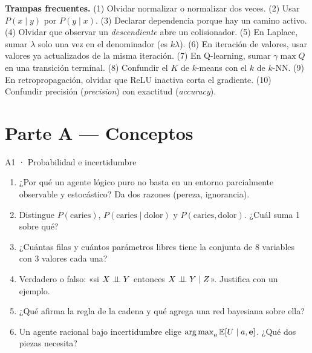 \begin{nota}
\textbf{Trampas frecuentes.} (1) Olvidar normalizar o normalizar dos veces. (2) Usar $P(x\mid y)$ por $P(y\mid x)$.
(3) Declarar dependencia porque hay un camino activo. (4) Olvidar que observar un \emph{descendiente} abre un colisionador.
(5) En Laplace, sumar $\lambda$ solo una vez en el denominador (es $k\lambda$). (6) En iteración de valores, usar valores ya
actualizados de la misma iteración. (7) En Q-learning, sumar $\gamma\max Q$ en una transición terminal. (8) Confundir el
$K$ de $k$-means con el $k$ de $k$-NN. (9) En retropropagación, olvidar que ReLU inactiva corta el gradiente. (10) Confundir
precisión (\emph{precision}) con exactitud (\emph{accuracy}).
\end{nota}

\newpage
\section{Parte A — Conceptos }

\begin{ejercicio}{A1 · Probabilidad e incertidumbre }
\begin{enumerate}[label=\arabic*.]
\item ¿Por qué un agente lógico puro no basta en un entorno parcialmente observable y estocástico? Da dos razones (pereza, ignorancia).
\item Distingue $P(\mathrm{caries})$, $P(\mathrm{caries}\mid\mathrm{dolor})$ y $P(\mathrm{caries},\mathrm{dolor})$. ¿Cuál suma 1 sobre qué?
\item ¿Cuántas filas y cuántos parámetros libres tiene la conjunta de 8 variables con 3 valores cada una?
\item Verdadero o falso: «si $X\perp\!\!\!\perp Y$ entonces $X\perp\!\!\!\perp Y\mid Z$». Justifica con un ejemplo.
\item ¿Qué afirma la regla de la cadena y qué agrega una red bayesiana sobre ella?
\item Un agente racional bajo incertidumbre elige $\operatorname*{arg\,max}_a\mathbb{E}[U\mid a,\mathbf e]$. ¿Qué dos piezas necesita?
\end{enumerate}
\end{ejercicio}

